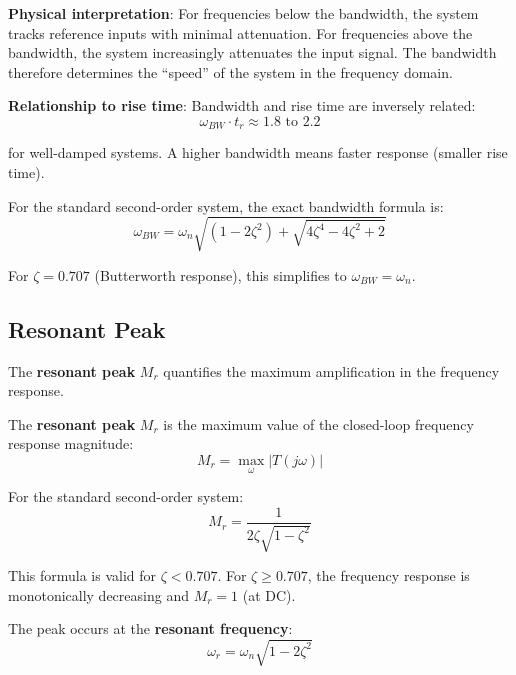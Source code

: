 \textbf{Physical interpretation}: For frequencies below the bandwidth, the system tracks reference inputs with minimal attenuation. For frequencies above the bandwidth, the system increasingly attenuates the input signal. The bandwidth therefore determines the ``speed'' of the system in the frequency domain.

\textbf{Relationship to rise time}: Bandwidth and rise time are inversely related:
\begin{equation}
    \omega_{BW} \cdot t_r \approx 1.8 \text{ to } 2.2
\end{equation}

for well-damped systems. A higher bandwidth means faster response (smaller rise time).

For the standard second-order system, the exact bandwidth formula is:
\begin{equation}
    \omega_{BW} = \omega_n \sqrt{(1 - 2\zeta^2) + \sqrt{4\zeta^4 - 4\zeta^2 + 2}}
    \label{eq:bandwidth_exact}
\end{equation}

For $\zeta = 0.707$ (Butterworth response), this simplifies to $\omega_{BW} = \omega_n$.

\subsection{Resonant Peak}
\label{subsec:resonant_peak}

The \textbf{resonant peak} $M_r$ quantifies the maximum amplification in the frequency response.

\begin{definition}
The \textbf{resonant peak} $M_r$ is the maximum value of the closed-loop frequency response magnitude:
\begin{equation}
    M_r = \max_{\omega} |T(j\omega)|
\end{equation}
\end{definition}

For the standard second-order system:
\begin{equation}
    M_r = \frac{1}{2\zeta\sqrt{1-\zeta^2}}
    \label{eq:resonant_peak}
\end{equation}

This formula is valid for $\zeta < 0.707$. For $\zeta \geq 0.707$, the frequency response is monotonically decreasing and $M_r = 1$ (at DC).

The peak occurs at the \textbf{resonant frequency}:
\begin{equation}
    \omega_r = \omega_n\sqrt{1 - 2\zeta^2}
\end{equation}

